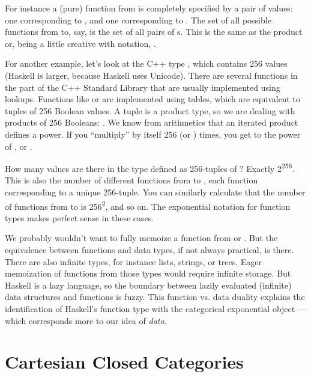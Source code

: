 For instance a (pure) function from  is completely
specified by a pair of values: one corresponding to , and
one corresponding to . The set of all possible functions
from  to, say,  is the set of all pairs of
s. This is the same as the product  or,
being a little creative with notation, .

For another example, let's look at the C++ type , which
contains 256 values (Haskell  is larger, because Haskell
uses Unicode). There are several functions in the \code{} part of the
C++ Standard Library that are usually implemented using lookups.
Functions like  or  are implemented
using tables, which are equivalent to tuples of 256 Boolean values. A
tuple is a product type, so we are dealing with products of 256
Booleans: . We know from
arithmetics that an iterated product defines a power. If you
``multiply''  by itself 256 (or ) times, you
get  to the power of , or .

How many values are there in the type defined as 256-tuples of
? Exactly 2\textsuperscript{256}. This is also the number
of different functions from  to , each
function corresponding to a unique 256-tuple. You can similarly
calculate that the number of functions from  to
 is 256\textsuperscript{2}, and so on. The exponential
notation for function types makes perfect sense in these cases.

We probably wouldn't want to fully memoize a function from 
or . But the equivalence between functions and data
types, if not always practical, is there. There are also infinite types,
for instance lists, strings, or trees. Eager memoization of functions
from those types would require infinite storage. But Haskell is a lazy
language, so the boundary between lazily evaluated (infinite) data
structures and functions is fuzzy. This function vs. data duality
explains the identification of Haskell's function type with the
categorical exponential object --- which corresponds more to our idea of
\emph{data}.

\section{Cartesian Closed
Categories}\label{cartesian-closed-categories}

